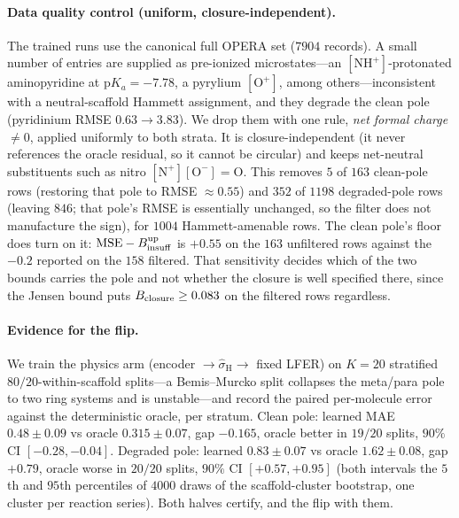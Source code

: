 \paragraph{Data quality control (uniform, closure-independent).} The trained runs use the canonical
full OPERA set ($7904$ records). A small number of entries are supplied as pre-ionized microstates---an
$[\mathrm{NH}^+]$-protonated aminopyridine at $\mathrm pK_a=-7.78$, a pyrylium $[\mathrm O^+]$, among
others---inconsistent with a neutral-scaffold Hammett assignment, and they degrade the clean pole
(pyridinium RMSE $0.63\!\to\!3.83$). We drop them with one rule, \emph{net formal charge} $\neq0$,
applied uniformly to both strata. It is closure-independent (it never references the oracle residual,
so it cannot be circular) and keeps net-neutral substituents such as nitro $[\mathrm N^+][\mathrm O^-]{=}\mathrm O$.
This removes $5$ of $163$ clean-pole rows (restoring that pole to RMSE ${\approx}0.55$) and $352$
of $1198$ degraded-pole rows (leaving $846$; that pole's RMSE is essentially unchanged, so the filter
does not manufacture the sign), for $1004$ Hammett-amenable rows. The clean pole's floor does turn on
it: $\mathrm{MSE}-B_{\mathrm{insuff}}^{\mathrm{up}}$ is $+0.55$ on the $163$ unfiltered rows against the $-0.2$
reported on the $158$ filtered. That sensitivity decides which of the two bounds carries the pole and
not whether the closure is well specified there, since the Jensen bound puts $B_{\mathrm{closure}}\ge0.083$ on the
filtered rows regardless.

\paragraph{Evidence for the flip.} We train the physics arm (encoder $\to\hat\sigma_{\mathrm H}\to$ fixed LFER)
on $K{=}20$ stratified $80/20$-within-scaffold splits---a Bemis--Murcko split collapses the meta/para
pole to two ring systems and is unstable---and record the paired per-molecule error against the
deterministic oracle, per stratum. Clean pole: learned MAE $0.48\pm0.09$ vs oracle $0.315\pm0.07$, gap
$-0.165$, oracle better in $19/20$ splits, $90\%$ CI $[-0.28,-0.04]$. Degraded pole: learned $0.83\pm0.07$ vs
oracle $1.62\pm0.08$, gap $+0.79$, oracle worse in $20/20$ splits, $90\%$ CI $[+0.57,+0.95]$ (both
intervals the $5$th and $95$th percentiles of $4000$ draws of the scaffold-cluster bootstrap, one
cluster per reaction series). Both halves certify, and the flip with them.

